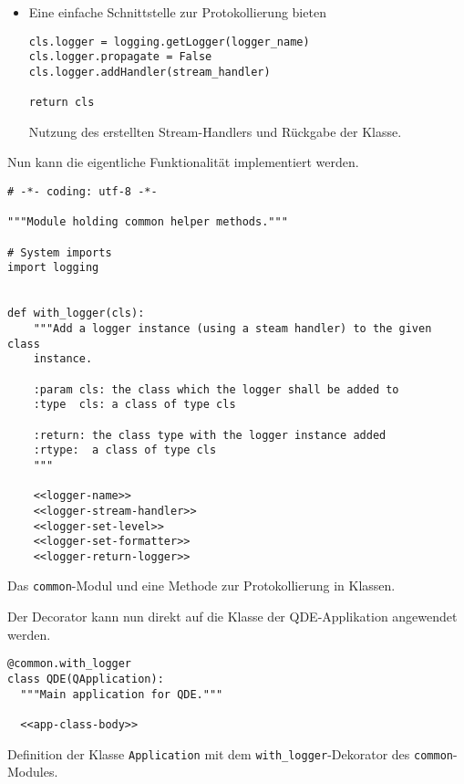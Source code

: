 \documentclass[10pt, openright, notitlepage]{scrreprt}
\begin{document}
\begin{itemize}
\item Eine einfache Schnittstelle zur Protokollierung bieten
\begin{listing}[H]
\begin{verbatim}
cls.logger = logging.getLogger(logger_name)
cls.logger.propagate = False
cls.logger.addHandler(stream_handler)

return cls
\end{verbatim}
\caption{\label{orgec61315}
Nutzung des erstellten Stream-Handlers und Rückgabe der Klasse.}
\end{listing}
\end{itemize}

Nun kann die eigentliche Funktionalität implementiert werden.

\begin{listing}[H]
\begin{verbatim}
# -*- coding: utf-8 -*-

"""Module holding common helper methods."""

# System imports
import logging


def with_logger(cls):
    """Add a logger instance (using a steam handler) to the given class
    instance.

    :param cls: the class which the logger shall be added to
    :type  cls: a class of type cls

    :return: the class type with the logger instance added
    :rtype:  a class of type cls
    """

    <<logger-name>>
    <<logger-stream-handler>>
    <<logger-set-level>>
    <<logger-set-formatter>>
    <<logger-return-logger>>
\end{verbatim}
\caption{\label{orgf8da5a6}
Das \texttt{common}-Modul und eine Methode zur Protokollierung in Klassen.}
\end{listing}


Der Decorator kann nun direkt auf die Klasse der QDE-Applikation angewendet
werden.

\begin{listing}[H]
\begin{verbatim}
@common.with_logger
class QDE(QApplication):
  """Main application for QDE."""

  <<app-class-body>>
\end{verbatim}
\caption{\label{org4069ad5}
Definition der Klasse \texttt{Application} mit dem \texttt{with\_logger}-Dekorator des \texttt{common}-Modules.}
\end{listing}
\end{document}
